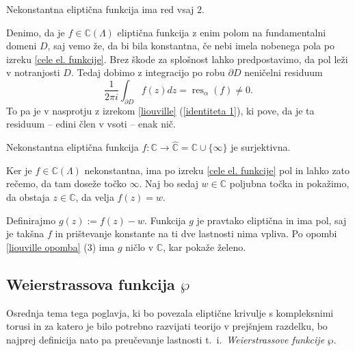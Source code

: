 \documentclass[mat1]{fmfdelo}
\newcommand{\C}{\mathbb C}
\newcommand{\RS}{\widehat{\C}}
\newcommand{\elf}{\C(\Lambda)}
\newcommand{\res}[2]{\operatorname{res}_{#1}(#2)}
\theoremstyle{definition}
\begin{document}
\begin{zgled*}

\end{zgled*}

\begin{posledica}
    \label{poseldica o redu elipticne funkcije}
    Nekonstantna eliptična funkcija ima red vsaj $2$.
\end{posledica}

\begin{dokaz}
    Denimo, da je $f \in \elf$ eliptična funkcija z enim polom na fundamentalni domeni $D$, saj vemo že, da bi bila konstantna, če nebi imela nobenega pola po izreku \ref{cele el. funkcije}. Brez škode za splošnost lahko predpostavimo, da pol leži v notranjosti $D$. Tedaj dobimo z integracijo po robu $\partial D$ neničelni residuum
    \[
        \frac{1}{2 \pi i} \int_{\partial D} f(z)dz = \res{\alpha}{f} \neq 0.  
    \]
    To pa je v nasprotju z izrekom \ref{liouville} (\ref{identiteta 1}), ki pove, da je ta residuum -- edini člen v vsoti -- enak nič. 
\end{dokaz}

\begin{posledica}
    Nekonstantna eliptična funkcija $f: \C \to \RS = \C \cup \{\infty\}$ je surjektivna. 
\end{posledica}

\begin{dokaz}
    Ker je $f \in \elf$ nekonstantna, ima po izreku \ref{cele el. funkcije} pol in lahko zato rečemo, da tam doseže točko $\infty$. Naj bo sedaj $w \in \C$ poljubna točka in pokažimo, da obstaja $z \in \C$, da velja $f(z) = w$.
    
    Definirajmo $g(z) := f(z) - w$. Funkcija $g$ je pravtako eliptična in ima pol, saj je takšna $f$ in prištevanje konstante na ti dve lastnosti nima vpliva. Po opombi \ref{liouville opomba} (3) ima $g$ ničlo v $\C$, kar pokaže želeno.
\end{dokaz}




\subsection{Weierstrassova funkcija $\wp$}

Osrednja tema tega poglavja, ki bo povezala eliptične krivulje s kompleksnimi torusi in za katero je bilo potrebno razvijati teorijo v prejšnjem razdelku, bo najprej definicija nato pa preučevanje lastnosti t.~i.\ \emph{Weierstrassove funkcije} $\wp$. 
\end{document}
